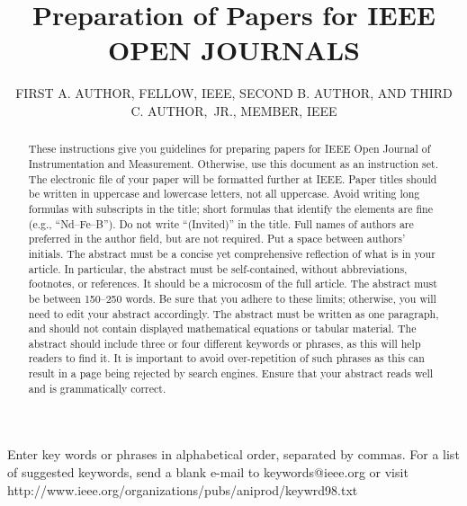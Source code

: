 \documentclass{IEEEoj}
\begin{document}

\title{Preparation of Papers for IEEE OPEN JOURNALS}

\author{FIRST A. AUTHOR, FELLOW, IEEE, SECOND B.
AUTHOR, AND THIRD C. AUTHOR,~JR.,
MEMBER, IEEE}

\begin{abstract}
These instructions give you guidelines for preparing papers for IEEE
Open Journal of Instrumentation and Measurement.
 Otherwise, use this document as an instruction set. The electronic file of your paper will be formatted further at IEEE. Paper titles should be written in uppercase and lowercase letters, not all uppercase. Avoid writing long formulas with subscripts in the title; short formulas that identify the elements are fine (e.g., ``Nd--Fe--B''). Do not write ``(Invited)'' in the title. Full names of authors are preferred in the author field, but are not required. Put a space between authors' initials. The abstract must be a concise yet comprehensive reflection of what is in your article. In particular, the abstract must be self-contained, without abbreviations, footnotes, or references. It should be a microcosm of the full article. The abstract must be between 150--250 words. Be sure that you adhere to these limits; otherwise, you will need to edit your abstract accordingly. The abstract must be written as one paragraph, and should not contain displayed mathematical equations or tabular material. The abstract should include three or four different keywords or phrases, as this will help readers to find it. It is important to avoid over-repetition of such phrases as this can result in a page being rejected by search engines. Ensure that your abstract reads well and is grammatically correct.
\end{abstract}

\begin{IEEEkeywords}
Enter key words or phrases in alphabetical order, separated by commas. For a list of suggested keywords, send a blank e-mail to keywords@ieee.org or visit 
http://www.ieee.org/\discretionary{}{}{}organizations/pubs/ani\textunderscore prod/keywrd98.txt
\end{IEEEkeywords}
\end{document}
